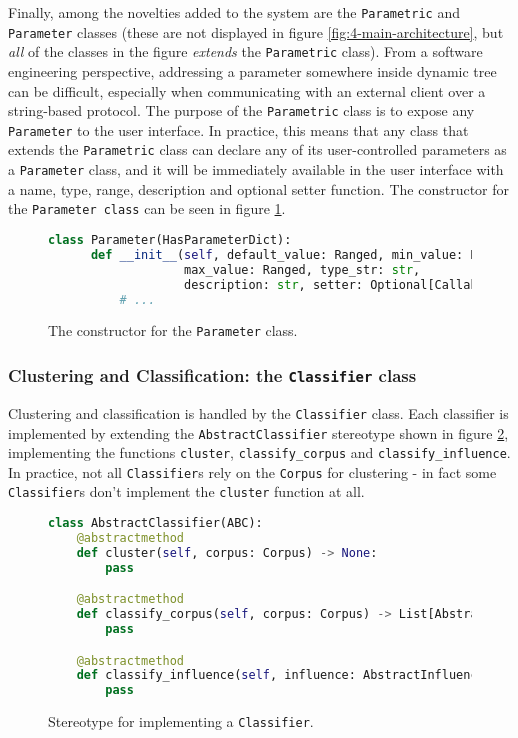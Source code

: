  Finally, among the novelties added to the system are the \texttt{Parametric} and \texttt{Parameter} classes (these are not displayed in figure \ref{fig:4-main-architecture}, but \textit{all} of the classes in the figure \textit{extends} the \texttt{Parametric} class). From a software engineering perspective, addressing a parameter somewhere inside dynamic tree can be difficult, especially when communicating with an external client over a string-based protocol. The purpose of the \texttt{Parametric} class is to expose any \texttt{Parameter} to the user interface. In practice, this means that any class that extends the \texttt{Parametric} class can declare any of its user-controlled parameters as a \texttt{Parameter} class, and it will be immediately available in the user interface with a name, type, range, description and optional setter function. The constructor for the \texttt{Parameter class} can be seen in figure \ref{fig:4-parameter}.
 
 \begin{figure}
 \begin{lstlisting}[language=Python]
 class Parameter(HasParameterDict):
      def __init__(self, default_value: Ranged, min_value: Ranged, 
                   max_value: Ranged, type_str: str, 
                   description: str, setter: Optional[Callable]):
          # ...
 \end{lstlisting}	
 \caption{The constructor for the \texttt{Parameter} class.}
 \label{fig:4-parameter}
 \end{figure}

 
 \subsubsection{Clustering and Classification: the \texttt{Classifier} class}\label{sec:4-main-architecture-classifiers}
 Clustering and classification is handled by the \texttt{Classifier} class. Each classifier is implemented by extending the \texttt{AbstractClassifier} stereotype shown in figure \ref{fig:4-classifier}, implementing the functions \texttt{cluster}, \texttt{classify\_corpus} and \texttt{classify\_\-influence}. In practice, not all \texttt{Classifier}s rely on the \texttt{Corpus} for clustering - in fact some \texttt{Classifier}s don't implement the \texttt{cluster} function at all.
 
 \begin{figure}
 \begin{lstlisting}[language=Python]
 class AbstractClassifier(ABC):
    @abstractmethod
    def cluster(self, corpus: Corpus) -> None:
        pass

    @abstractmethod
    def classify_corpus(self, corpus: Corpus) -> List[AbstractLabel]:
        pass

    @abstractmethod
    def classify_influence(self, influence: AbstractInfluence) -> AbstractLabel:
        pass	
 \end{lstlisting}
 \caption{Stereotype for implementing a \texttt{Classifier}.}
 \label{fig:4-classifier}
 \end{figure}
 
